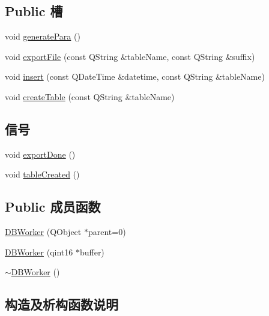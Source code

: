 \subsection*{Public 槽}
\begin{DoxyCompactItemize}
\item 
void \hyperlink{class_d_b_worker_aa71a7eec68cdcec515ec0c11a33865ec}{generate\+Para} ()
\item 
void \hyperlink{class_d_b_worker_a188d324c26f6d112bca1db7f3115262d}{export\+File} (const Q\+String \&table\+Name, const Q\+String \&suffix)
\item 
void \hyperlink{class_d_b_worker_ae56132fc6027e5d06abdc077bcb49fc7}{insert} (const Q\+Date\+Time \&datetime, const Q\+String \&table\+Name)
\item 
void \hyperlink{class_d_b_worker_a37a2193ad84d7276c06795e23b76afa2}{create\+Table} (const Q\+String \&table\+Name)
\end{DoxyCompactItemize}
\subsection*{信号}
\begin{DoxyCompactItemize}
\item 
void \hyperlink{class_d_b_worker_ab89c620df543d5a046626ca64fc64dc1}{export\+Done} ()
\item 
void \hyperlink{class_d_b_worker_a9e1c54915c77ee1aac911ae90a3072cc}{table\+Created} ()
\end{DoxyCompactItemize}
\subsection*{Public 成员函数}
\begin{DoxyCompactItemize}
\item 
\hyperlink{class_d_b_worker_ae87336f36d643f7afc331ba9953b059a}{D\+B\+Worker} (Q\+Object $\ast$parent=0)
\item 
\hyperlink{class_d_b_worker_a23bbf99c73d80b9a6a0cebb332591ae3}{D\+B\+Worker} (qint16 $\ast$buffer)
\item 
\hyperlink{class_d_b_worker_a5b3c98063d26d42c67511fb3f565b9f0}{$\sim$\+D\+B\+Worker} ()
\end{DoxyCompactItemize}


\subsection{构造及析构函数说明}
